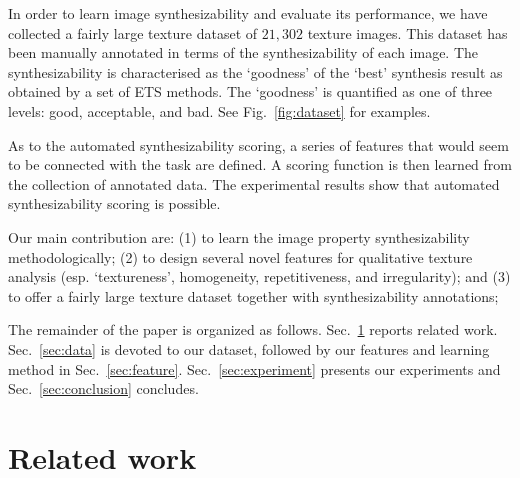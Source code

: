 In order to learn image synthesizability and evaluate its performance, we have collected
a fairly large texture dataset of $21,302$ texture images. This dataset has been manually annotated 
in terms of the synthesizability of each image. The synthesizability is characterised as the 
`goodness' of the `best' synthesis result as obtained by a set of ETS methods. The `goodness' is quantified 
as one of three levels: good, acceptable, and bad. See Fig.~\ref{fig:dataset} for examples. 



As to the automated synthesizability scoring, a series of features
that would seem to be connected with the task are defined.  A scoring
function is then learned from the collection of annotated data.  The
experimental results show that automated synthesizability scoring is
possible.

Our main contribution are: (1) to learn the image property
synthesizability methodologically; (2) to design several novel
features for qualitative texture analysis (esp. `textureness',
homogeneity, repetitiveness, and irregularity); and (3) to offer a fairly
large texture dataset together with synthesizability annotations;


The remainder of the paper is organized as follows.
Sec.~\ref{sec:related} reports related work.
Sec.~\ref{sec:data} is devoted to our dataset, followed by our features and learning method in Sec.~\ref{sec:feature}.
Sec.~\ref{sec:experiment} presents our experiments and Sec.~\ref{sec:conclusion} concludes. 


\section{Related work}
\label{sec:related}

